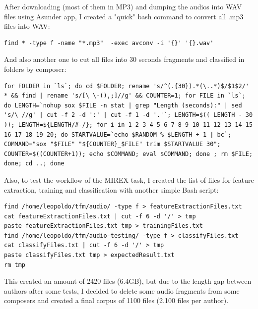 \documentclass[a4paper,openany,oneside,12pt]{book}
\begin{document}
After downloading (most of them in MP3) and dumping the audios into WAV files using Asunder app, I created a "quick" bash command to convert all .mp3 files into WAV:
\lstset{language=Bash,
           basicstyle=\ttfamily\scriptsize,
           keywordstyle=\ttfamily,
           stringstyle=\ttfamily,
           commentstyle=\ttfamily,
          breaklines=true
          }
\begin{lstlisting}
find * -type f -name "*.mp3"  -exec avconv -i '{}' '{}.wav'
\end{lstlisting}

And also another one to cut all files into 30 seconds fragments and classified in folders by composer:
\lstset{language=Bash,
           basicstyle=\ttfamily\scriptsize,
           keywordstyle=\ttfamily,
           stringstyle=\ttfamily,
           commentstyle=\ttfamily,
          breaklines=true
          }
\begin{lstlisting}
for FOLDER in `ls`; do cd $FOLDER; rename 's/^(.{30}).*(\..*)$/$1$2/' * && find | rename 's/[\ \-(),;]//g' && COUNTER=1; for FILE in `ls`; do LENGTH=`nohup sox $FILE -n stat | grep "Length (seconds):" | sed 's/\ //g' | cut -f 2 -d ':' | cut -f 1 -d '.'`; LENGTH=$(( LENGTH - 30 )); LENGTH=${LENGTH/#-/}; for i in 1 2 3 4 5 6 7 8 9 10 11 12 13 14 15 16 17 18 19 20; do STARTVALUE=`echo $RANDOM % $LENGTH + 1 | bc`; COMMAND="sox "$FILE" "${COUNTER}_$FILE" trim $STARTVALUE 30"; COUNTER=$((COUNTER+1)); echo $COMMAND; eval $COMMAND; done ; rm $FILE; done; cd ..; done
\end{lstlisting}

Also, to test the workflow of the MIREX task, I created the list of files for feature extraction, training and classification with another simple Bash script:

\lstset{language=Bash,
           basicstyle=\ttfamily\scriptsize,
           keywordstyle=\ttfamily,
           stringstyle=\ttfamily,
           commentstyle=\ttfamily,
          breaklines=true
          }
\begin{lstlisting}
find /home/leopoldo/tfm/audio/ -type f > featureExtractionFiles.txt
cat featureExtractionFiles.txt | cut -f 6 -d '/' > tmp
paste featureExtractionFiles.txt tmp > trainingFiles.txt
find /home/leopoldo/tfm/audio-testing/ -type f > classifyFiles.txt
cat classifyFiles.txt | cut -f 6 -d '/' > tmp
paste classifyFiles.txt tmp > expectedResult.txt
rm tmp
\end{lstlisting}


This created an amount of 2420 files (6.4GB), but due to the length gap between authors after some tests, I decided to delete some audio fragments from some composers and created a final corpus of 1100 files (2.100 files per author).
\end{document}
